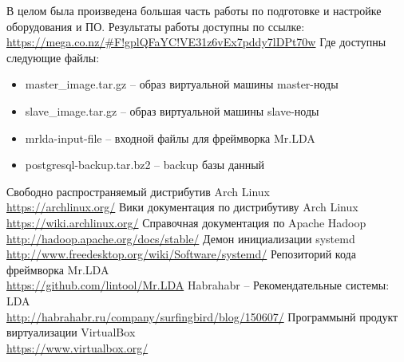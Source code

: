 В целом была произведена большая часть работы по подготовке и настройке оборудования и ПО. Результаты 
работы доступны по ссылке:\\
\url{https://mega.co.nz/#F!gplQFaYC!VE31z6vEx7pddy7lDPt70w}
Где доступны следующие файлы:
\begin{itemize}
    \item master\_image.tar.gz -- образ виртуальной машины master-ноды
    \item slave\_image.tar.gz -- образ виртуальной машины slave-ноды
    \item mrlda-input-file -- входной файлы для фреймворка Mr.LDA
    \item postgresql-backup.tar.bz2 -- backup базы данный
\end{itemize}

\newpage

\renewcommand{\refname}{Информационные источники}
\begin{thebibliography}{10}
     Свободно распространяемый дистрибутив Arch Linux\\
        \url{https://archlinux.org/}
     Вики документация по дистрибутиву Arch Linux\\
        \url{https://wiki.archlinux.org/}
     Справочная документация по Apache Hadoop\\
        \url{http://hadoop.apache.org/docs/stable/}
     Демон инициализации systemd\\
        \url{http://www.freedesktop.org/wiki/Software/systemd/}
     Репозиторий кода фреймворка Mr.LDA\\
        \url{https://github.com/lintool/Mr.LDA}
     Habrahabr -- Рекомендательные системы: LDA\\
        \url{http://habrahabr.ru/company/surfingbird/blog/150607/}
     Программынй продукт виртуализации VirtualBox\\
        \url{https://www.virtualbox.org/}
\end{thebibliography}

